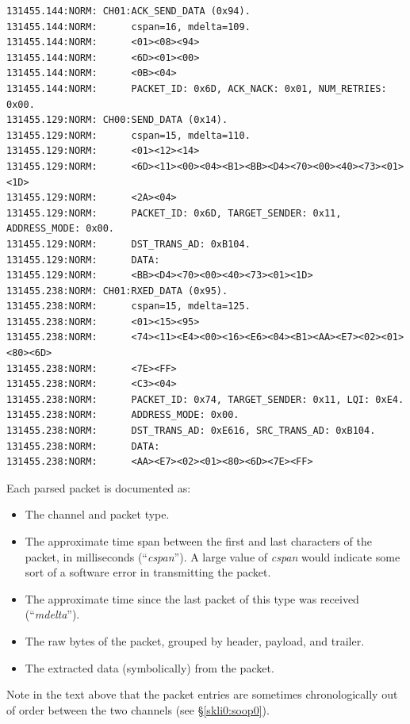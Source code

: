 \documentclass[letterpaper,10pt,titlepage]{article}
\begin{document}
\begin{footnotesize}
\begin{verbatim}
131455.144:NORM: CH01:ACK_SEND_DATA (0x94).
131455.144:NORM:      cspan=16, mdelta=109.
131455.144:NORM:      <01><08><94>
131455.144:NORM:      <6D><01><00>
131455.144:NORM:      <0B><04>
131455.144:NORM:      PACKET_ID: 0x6D, ACK_NACK: 0x01, NUM_RETRIES: 0x00.
131455.129:NORM: CH00:SEND_DATA (0x14).
131455.129:NORM:      cspan=15, mdelta=110.
131455.129:NORM:      <01><12><14>
131455.129:NORM:      <6D><11><00><04><B1><BB><D4><70><00><40><73><01><1D>
131455.129:NORM:      <2A><04>
131455.129:NORM:      PACKET_ID: 0x6D, TARGET_SENDER: 0x11, ADDRESS_MODE: 0x00.
131455.129:NORM:      DST_TRANS_AD: 0xB104.
131455.129:NORM:      DATA:
131455.129:NORM:      <BB><D4><70><00><40><73><01><1D>
131455.238:NORM: CH01:RXED_DATA (0x95).
131455.238:NORM:      cspan=15, mdelta=125.
131455.238:NORM:      <01><15><95>
131455.238:NORM:      <74><11><E4><00><16><E6><04><B1><AA><E7><02><01><80><6D>
131455.238:NORM:      <7E><FF>
131455.238:NORM:      <C3><04>
131455.238:NORM:      PACKET_ID: 0x74, TARGET_SENDER: 0x11, LQI: 0xE4.
131455.238:NORM:      ADDRESS_MODE: 0x00.
131455.238:NORM:      DST_TRANS_AD: 0xE616, SRC_TRANS_AD: 0xB104.
131455.238:NORM:      DATA:
131455.238:NORM:      <AA><E7><02><01><80><6D><7E><FF>
\end{verbatim}
\end{footnotesize}

Each parsed packet is documented as:

\begin{itemize}
\item The channel and packet type.
\item The approximate time span between the first and last 
      characters of the packet, in milliseconds (``\emph{cspan}'').
      A large value of \emph{cspan} would indicate some sort of
      a software error in transmitting the packet.
\item The approximate time since the last packet of this type
      was received (``\emph{mdelta}'').
\item The raw bytes of the packet, grouped by header, payload,
      and trailer.
\item The extracted data (symbolically) from the packet.
\end{itemize}

Note in the text above that the packet entries are sometimes
chronologically out of order between the two channels
(see \S{}\ref{skli0:soop0}).
\end{document}
